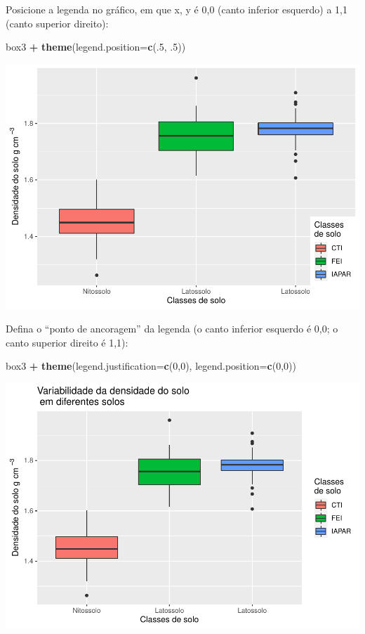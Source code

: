 \documentclass[
]{book}
\newenvironment{Shaded}{\begin{snugshade}}{\end{snugshade}}
\newcommand{\DataTypeTok}[1]{\textcolor[rgb]{0.13,0.29,0.53}{#1}}
\newcommand{\DecValTok}[1]{\textcolor[rgb]{0.00,0.00,0.81}{#1}}
\newcommand{\FloatTok}[1]{\textcolor[rgb]{0.00,0.00,0.81}{#1}}
\newcommand{\KeywordTok}[1]{\textcolor[rgb]{0.13,0.29,0.53}{\textbf{#1}}}
\newcommand{\NormalTok}[1]{#1}
\newcommand{\OperatorTok}[1]{\textcolor[rgb]{0.81,0.36,0.00}{\textbf{#1}}}
\newcommand{\StringTok}[1]{\textcolor[rgb]{0.31,0.60,0.02}{#1}}
\begin{document}
Posicione a legenda no gráfico, em que x, y é 0,0 (canto inferior esquerdo) a 1,1 (canto superior direito):

\begin{Shaded}
\begin{Highlighting}[]
\NormalTok{box3 }\OperatorTok{+}\StringTok{ }\KeywordTok{theme}\NormalTok{(}\DataTypeTok{legend.position=}\KeywordTok{c}\NormalTok{(.}\DecValTok{5}\NormalTok{, }\FloatTok{.5}\NormalTok{))}
\end{Highlighting}
\end{Shaded}

\includegraphics{TudodoR_files/figure-latex/unnamed-chunk-218-1.pdf}

Defina o ``ponto de ancoragem'' da legenda (o canto inferior esquerdo é 0,0; o canto superior direito é 1,1):

\begin{Shaded}
\begin{Highlighting}[]
\NormalTok{box3 }\OperatorTok{+}\StringTok{ }\KeywordTok{theme}\NormalTok{(}\DataTypeTok{legend.justification=}\KeywordTok{c}\NormalTok{(}\DecValTok{0}\NormalTok{,}\DecValTok{0}\NormalTok{), }\DataTypeTok{legend.position=}\KeywordTok{c}\NormalTok{(}\DecValTok{0}\NormalTok{,}\DecValTok{0}\NormalTok{))}
\end{Highlighting}
\end{Shaded}

\includegraphics{TudodoR_files/figure-latex/unnamed-chunk-219-1.pdf}
\end{document}
